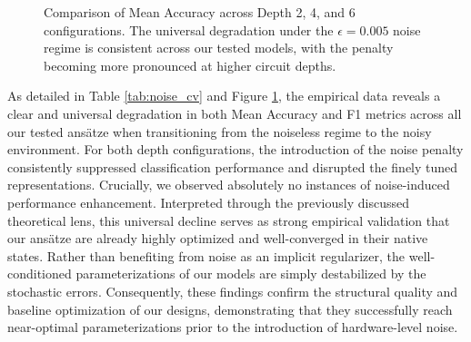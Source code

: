 \documentclass[11pt]{article}
\begin{document}
\begin{figure}[htbp]
    \centering
    \caption{Comparison of Mean Accuracy across Depth 2, 4, and 6 configurations. The universal degradation under the $\epsilon = 0.005$ noise regime is consistent across our tested models, with the penalty becoming more pronounced at higher circuit depths.}
    \label{fig:noise_cv_chart}
\end{figure}

As detailed in Table \ref{tab:noise_cv} and Figure \ref{fig:noise_cv_chart}, the empirical data reveals a clear and universal degradation in both Mean Accuracy and F1 metrics across all our tested ans\"atze when transitioning from the noiseless regime to the noisy environment. For both depth configurations, the introduction of the noise penalty consistently suppressed classification performance and disrupted the finely tuned representations. Crucially, we observed absolutely no instances of noise-induced performance enhancement. Interpreted through the previously discussed theoretical lens, this universal decline serves as strong empirical validation that our ans\"atze are already highly optimized and well-converged in their native states. Rather than benefiting from noise as an implicit regularizer, the well-conditioned parameterizations of our models are simply destabilized by the stochastic errors. Consequently, these findings confirm the structural quality and baseline optimization of our designs, demonstrating that they successfully reach near-optimal parameterizations prior to the introduction of hardware-level noise.
\end{document}
